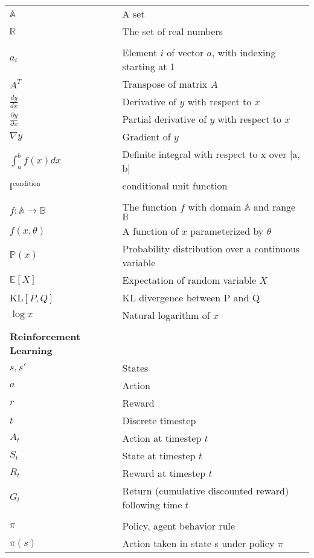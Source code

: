 \begin{longtable}{ll}
$\mathbb{A}$ & A set \\
$\mathbb{R}$ & The set of real numbers \\

\\
$a_i$ & Element $i$ of vector $a$, with indexing starting at 1 \\
$A^T$ & Transpose of matrix $A$ \\
$\frac{dy}{dx}$ & Derivative of $y$ with respect to $x$\\
$\frac{\partial y}{\partial x}$ & Partial derivative of $y$ with respect to $x$ \\
$\nabla y$ & Gradient of $y$ \\
$\int_a^bf(x)dx $ & Definite integral with respect to x over [a, b] \\
$\mathbb{I}^{\text{condition}}$ & conditional unit function \\

\\
$f:\mathbb{A}\to\mathbb{B}$ & The function $f$ with domain $\mathbb{A}$ and range $\mathbb{B}$ \\
$f(x,\theta)$ & A function of $x$ parameterized by $\theta$

\\
$\mathbb{P}(x)$ & Probability distribution over a continuous variable \\
$\mathbb{E}[X]$ & Expectation of random variable $X$ \\
KL$[P,Q]$       & KL divergence between P and Q \\
$\log{x}$ & Natural logarithm of $x$ \\


\\ \textbf{Reinforcement Learning} \\
$s, s\prime$ & States \\
$a$ & Action \\
$r$ & Reward \\
$t$ & Discrete timestep \\
$A_t$ & Action at timestep $t$ \\
$S_t$ & State at timestep $t$ \\
$R_t$ & Reward at timestep $t$ \\
$G_t$ & Return (cumulative discounted reward) following time $t$ \\ 

\\
$\pi$ & Policy, agent behavior rule \\
$\pi(s)$ &  Action taken in state s under policy $\pi$ \\


\end{longtable}
